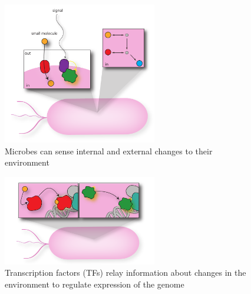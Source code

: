 \documentclass{article}
\begin{document}

\newpage
%
%
\printbibliography 

\newpage
\begin{figure}[h!]
    \centering
    \includegraphics[width=0.6\textwidth]{figures/cell_env_signal_external}
    \caption[Microbes can sense internal and external changes to their environment]{Microbes can sense internal and external changes to their environment}
    \label{fig:chap1:cellsense}
\end{figure}

\begin{figure}[h!]
    \centering
    \includegraphics[width=0.6\textwidth]{figures/cell_env_internall}
 	\caption[Transcription factors (TFs) relay information about changes in the environment to regulate expression of the genome]{Transcription factors (TFs) relay information about changes in the environment to regulate expression of the genome}
    \label{fig:chap1:cellrelay}
\end{figure}
\end{document}
